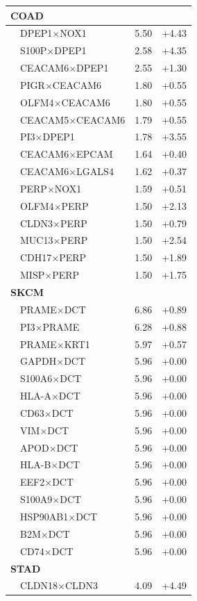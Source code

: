 \begin{longtable}{llrr}
\multicolumn{4}{l}{\textbf{COAD}}\\\hline
 & DPEP1$\times$NOX1 & 5.50 & +4.43\\
 & S100P$\times$DPEP1 & 2.58 & +4.35\\
 & CEACAM6$\times$DPEP1 & 2.55 & +1.30\\
 & PIGR$\times$CEACAM6 & 1.80 & +0.55\\
 & OLFM4$\times$CEACAM6 & 1.80 & +0.55\\
 & CEACAM5$\times$CEACAM6 & 1.79 & +0.55\\
 & PI3$\times$DPEP1 & 1.78 & +3.55\\
 & CEACAM6$\times$EPCAM & 1.64 & +0.40\\
 & CEACAM6$\times$LGALS4 & 1.62 & +0.37\\
 & PERP$\times$NOX1 & 1.59 & +0.51\\
 & OLFM4$\times$PERP & 1.50 & +2.13\\
 & CLDN3$\times$PERP & 1.50 & +0.79\\
 & MUC13$\times$PERP & 1.50 & +2.54\\
 & CDH17$\times$PERP & 1.50 & +1.89\\
 & MISP$\times$PERP & 1.50 & +1.75\\
\multicolumn{4}{l}{\textbf{SKCM}}\\\hline
 & PRAME$\times$DCT & 6.86 & +0.89\\
 & PI3$\times$PRAME & 6.28 & +0.88\\
 & PRAME$\times$KRT1 & 5.97 & +0.57\\
 & GAPDH$\times$DCT & 5.96 & +0.00\\
 & S100A6$\times$DCT & 5.96 & +0.00\\
 & HLA-A$\times$DCT & 5.96 & +0.00\\
 & CD63$\times$DCT & 5.96 & +0.00\\
 & VIM$\times$DCT & 5.96 & +0.00\\
 & APOD$\times$DCT & 5.96 & +0.00\\
 & HLA-B$\times$DCT & 5.96 & +0.00\\
 & EEF2$\times$DCT & 5.96 & +0.00\\
 & S100A9$\times$DCT & 5.96 & +0.00\\
 & HSP90AB1$\times$DCT & 5.96 & +0.00\\
 & B2M$\times$DCT & 5.96 & +0.00\\
 & CD74$\times$DCT & 5.96 & +0.00\\
\multicolumn{4}{l}{\textbf{STAD}}\\\hline
 & CLDN18$\times$CLDN3 & 4.09 & +4.49\\

\end{longtable}
